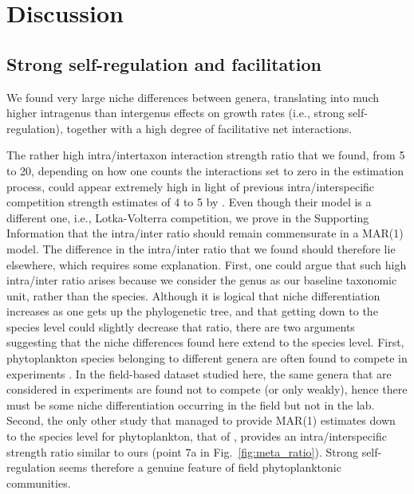 \documentclass[10pt]{article}
\begin{document}
\section*{Discussion}

\subsection*{Strong self-regulation and facilitation}

We found very large niche differences between genera, translating
into much higher intragenus than intergenus effects on growth rates
(i.e., strong self-regulation), together with a high degree of facilitative
net interactions.

The rather high intra/intertaxon interaction strength ratio \citep{levine_importance_2009}
that we found, from 5 to 20, depending on how one counts the interactions
set to zero in the estimation process, could appear extremely high
in light of previous intra/interspecific competition strength estimates
of 4 to 5 by \citet{adler_competition_2018}. Even though their model
is a different one, i.e., Lotka-Volterra competition, we prove in
the Supporting Information that the intra/inter ratio should remain
commensurate in a MAR(1) model. The difference in the intra/inter ratio that we found
should therefore lie elsewhere, which requires some explanation. First,
one could argue that such high intra/inter ratio arises because we
consider the genus as our baseline taxonomic unit, rather than the
species. Although it is logical that niche differentiation increases
as one gets up the phylogenetic tree, and that getting down to the
species level could slightly decrease that ratio, there are two arguments
suggesting that the niche differences found here extend to the species
level. First, phytoplankton species belonging to different genera
are often found to compete in experiments \citep{titman_ecological_1976,tilman_phytoplankton_1982,descamps-julien_stable_2005}. In the field-based
dataset studied here, the same genera that are considered in experiments
are found not to compete (or only weakly), hence there must be some
niche differentiation occurring in the field but not in the lab. Second,
the only other study that managed to provide MAR(1) estimates down
to the species level for phytoplankton, that of \citet{huber_role_2006},
provides an intra/interspecific strength ratio similar to ours (point
7a in Fig.~\ref{fig:meta_ratio}). Strong self-regulation seems therefore
a genuine feature of field phytoplanktonic communities.
\end{document}
